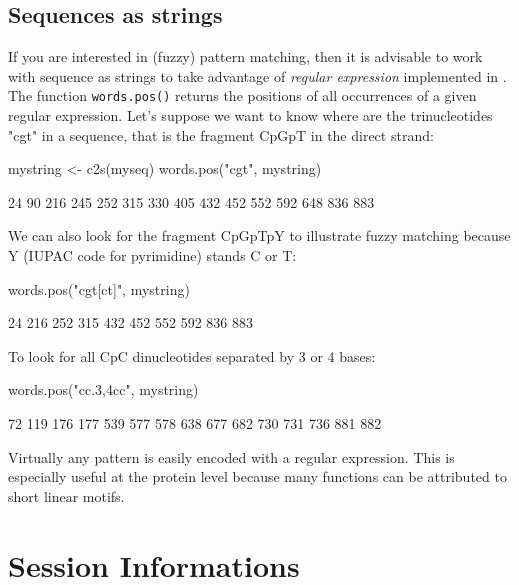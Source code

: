 \documentclass{article}
\begin{document}
\subsection{Sequences as strings}

If you are interested in (fuzzy) pattern matching, then it is advisable to work with
sequence as strings to take advantage of \emph{regular expression} implemented
in \Rlogo{}. The function \texttt{words.pos()} returns the positions of all occurrences
of a given regular expression. Let's suppose we want to know where are the trinucleotides
"cgt" in a sequence, that is the fragment CpGpT in the direct strand:

\begin{Schunk}
\begin{Sinput}
 mystring <- c2s(myseq)
 words.pos("cgt", mystring)
\end{Sinput}
\begin{Soutput}
 [1]  24  90 216 245 252 315 330 405 432 452 552 592 648 836 883
\end{Soutput}
\end{Schunk}

We can also look for the fragment CpGpTpY to illustrate fuzzy matching because
Y (IUPAC code for pyrimidine) stands C or T:

\begin{Schunk}
\begin{Sinput}
 words.pos("cgt[ct]", mystring)
\end{Sinput}
\begin{Soutput}
 [1]  24 216 252 315 432 452 552 592 836 883
\end{Soutput}
\end{Schunk}

To look for all CpC dinucleotides separated by 3 or 4 bases:
\begin{Schunk}
\begin{Sinput}
 words.pos("cc.{3,4}cc", mystring)
\end{Sinput}
\begin{Soutput}
 [1]  72 119 176 177 539 577 578 638 677 682 730 731 736 881 882
\end{Soutput}
\end{Schunk}

Virtually any pattern is easily encoded with a regular expression. This is
especially useful at the protein level because many functions can be attributed 
to short linear motifs.


\section{Session Informations}
\end{document}
